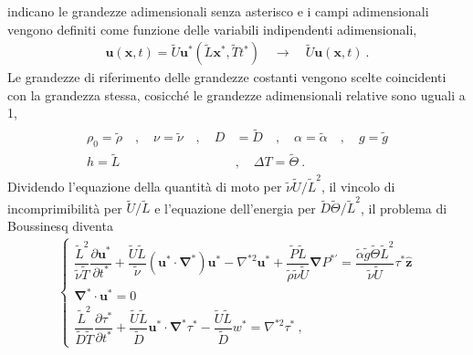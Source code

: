\documentclass[letterpaper,10pt,italian]{jupyterBook}
\begin{document}
\sphinxAtStartPar
indicano le grandezze adimensionali senza asterisco e i campi
adimensionali vengono definiti come funzione delle variabili
indipendenti adimensionali,
\begin{equation*}
\begin{split}\mathbf{u}(\mathbf{x},t) = \tilde{U} \mathbf{u}^*(\tilde{L} \mathbf{x}^*, \tilde{T} t^*) \quad \rightarrow \quad \tilde{U} \mathbf{u}(\mathbf{x},  t) \ .\end{split}
\end{equation*}
\sphinxAtStartPar
Le grandezze di riferimento delle grandezze costanti vengono scelte
coincidenti con la grandezza stessa, cosicché le grandezze adimensionali
relative sono uguali a 1,
\begin{equation*}
\begin{split}\label{eqn:var-adim-2}
\begin{aligned}
    \rho_0 = \tilde{\rho} \quad  , \quad \nu = \tilde{\nu} \quad , \quad D & = \tilde{D}  \quad , \quad \alpha = \tilde{\alpha}  \quad , \quad g = \tilde{g}  \\
    h = \tilde{L}  \quad & , \quad \Delta T = \tilde{\Theta}  \ .
\end{aligned}\end{split}
\end{equation*}
\sphinxAtStartPar
Dividendo l’equazione della quantità di moto per
\(\tilde{\nu}\tilde{U}/\tilde{L}^2\), il vincolo di incomprimibilità per
\(\tilde{U}/\tilde{L}\) e l’equazione dell’energia per
\(\tilde{D}\tilde{\Theta}/\tilde{L}^2\), il problema di Boussinesq diventa
\begin{equation*}
\begin{split}\label{eqn:Bouss-tau-adim-2}
    \begin{cases}
      \dfrac{\tilde{L}^2}{\tilde{\nu}\tilde{T}}\dfrac{\partial \mathbf{u}^*}{\partial t^*} + \dfrac{\tilde{U}\tilde{L}}{\tilde{\nu}}
      \left( \mathbf{u}^* \cdot \mathbf{\nabla}^* \right) \mathbf{u}^* -
      \nabla^{*2} \mathbf{u}^* + \dfrac{\tilde{P}\tilde{L}}{\tilde{\rho} \tilde{\nu} \tilde{U}}\mathbf{\nabla} P^{*'} = \dfrac{\tilde{\alpha} \tilde{g} \tilde{\Theta} \tilde{L}^2}{\tilde{\nu} \tilde{U}} \tau^* \mathbf{\hat{z}} \\
      \mathbf{\nabla}^* \cdot \mathbf{u}^* = 0 \\
      \dfrac{\tilde{L}^2}{\tilde{D}\tilde{T}}\dfrac{\partial \tau^*}{\partial t^*} + \dfrac{\tilde{U}\tilde{L}}{\tilde{D}}\mathbf{u}^* \cdot 
      \mathbf{\nabla}^* \tau^* - \dfrac{\tilde{U}\tilde{L}}{\tilde{D}} w^* = \nabla^{*2} \tau^* \ ,
    \end{cases}\end{split}
\end{equation*}
\end{document}
